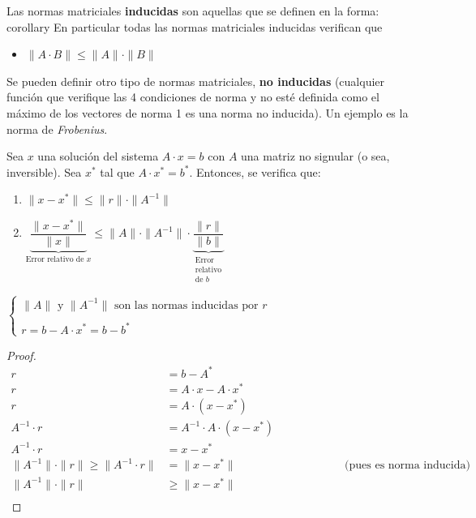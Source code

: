 \documentclass[]{article}
\begin{document}
Las normas matriciales \textbf{inducidas} son aquellas que se definen en la forma:
corollary
En particular todas las normas matriciales inducidas verifican que
\begin{itemize}
	\item $\|A\cdot B\| \leq \|A\| \cdot \|B\|$
\end{itemize}

Se pueden definir otro tipo de normas matriciales, \textbf{no inducidas} (cualquier función que verifique las 4 condiciones de norma y no esté definida como el máximo de los vectores de norma 1 es una norma no inducida). Un ejemplo es la norma de \emph{Frobenius}.


\begin{prop} Sea $x$ una solución del sistema $A\cdot x = b$ con $A$ una matriz no signular (o sea, inversible). Sea $x^*$ tal que $A\cdot x^*=b^*$. Entonces, se verifica que:
	~\newline

	\begin{minipage}{0.5\linewidth}\centering
	\begin{enumerate}
		\item $\|x-x^*\| \leq \|r\|\cdot\|A^{-1}\|$
		\item $\underbrace{\dfrac{\|x-x^*\|}{\|x\|}}_{\text{Error relativo de }x} \leq \|A\|\cdot\|A^{-1}\| \cdot \underbrace{\dfrac{\|r\|}{\|b\|}}_{\substack{\text{Error} \\ \text{relativo}\\ \text{de }b}}$
	\end{enumerate}
	\end{minipage}
	\begin{minipage}{0\linewidth}\centering
		$\begin{cases}
			\|A\|\text{ y }\|A^{-1}\|\text{ son las normas inducidas por }r\\
			\\
			r = b-A\cdot x^* = b-b^*
		\end{cases}$
	\end{minipage}

	\begin{proof}
		\begin{align*}
			r &= b-A^*\\
			r &= A\cdot x - A\cdot x^*\\
			r &= A\cdot(x-x^*)\\
			A^{-1}\cdot r &= A^{-1}\cdot A\cdot (x-x^*)\\
			A^{-1}\cdot r &= x-x^*\\
			\|A^{-1}\|\cdot\|r\| \geq \|A^{-1}\cdot r\| &= \|x-x^*\| \hspace{4cm} \text{(pues es norma inducida)}\\
			\|A^{-1}\|\cdot\|r\| &\geq \|x-x^*\|\\
		\end{align*}


\end{proof}
\end{prop}
\end{document}
